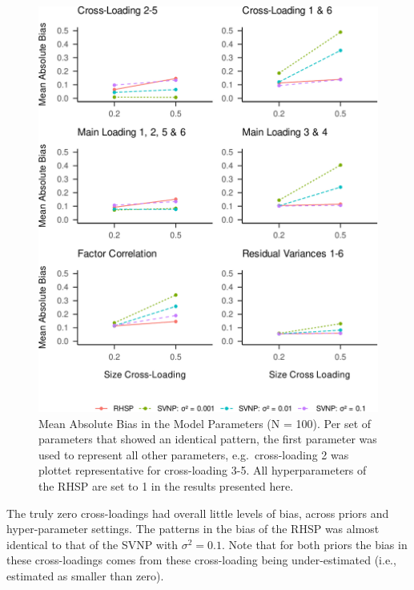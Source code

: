 \documentclass[
  man, donotrepeattitle,floatsintext]{apa6}
\begin{document}
\begin{figure}
\centering
\includegraphics{JMBKoch_thesis_files/figure-latex/unnamed-chunk-5-1.pdf}
\caption{\label{fig:unnamed-chunk-5}Mean Absolute Bias in the Model Parameters (N = 100). Per set of parameters that showed an identical pattern, the first parameter was used to represent all other parameters, e.g.~cross-loading 2 was plottet representative for cross-loading 3-5. All hyperparameters of the RHSP are set to 1 in the results presented here.}
\end{figure}

The truly zero cross-loadings had overall little levels of bias, across priors and hyper-parameter settings. The patterns in the bias of the RHSP was almost identical to that of the SVNP with \(\sigma^2 = 0.1\). Note that for both priors the bias in these cross-loadings comes from these cross-loading being under-estimated (i.e., estimated as smaller than zero).
\end{document}
